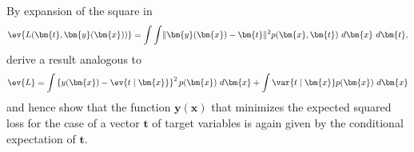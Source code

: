 \begin{question}{1.26}
	By expansion of the square in
	\begin{align*}
		\ev{L(\bm{t}, \bm{y}(\bm{x}))} = \int\int \lVert \bm{y}(\bm{x}) - \bm{t} \rVert^2 p(\bm{x}, \bm{t})\ d\bm{x}\ d\bm{t},
	\end{align*}
	derive a result analogous to
	\begin{align*}
		\ev{L} = \int \left\{ y(\bm{x}) - \ev{t \mid \bm{x}} \right\}^2 p(\bm{x})\ d\bm{x} + \int \var{t \mid \bm{x}} p(\bm{x})\ d\bm{x}
	\end{align*}
	and hence show that the function $\bm{y}(\bm{x})$ that minimizes the expected squared loss for the case of a vector $\bm{t}$ of target variables is again given by the conditional expectation of $\bm{t}$.
\end{question}

